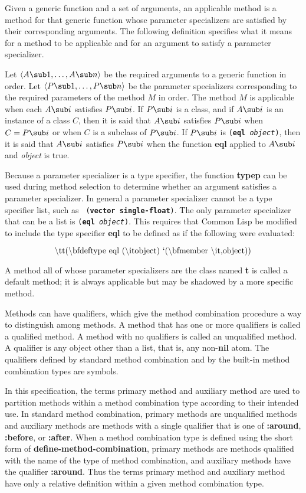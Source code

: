 Given a generic function and a set of arguments, an {\bit applicable
method\/} is a method for that generic function whose parameter
specializers are satisfied by their corresponding arguments.  The
following definition specifies what it means for a method to be
applicable and for an argument to satisfy a parameter specializer.

Let $\langle A\sub 1, \ldots, A\sub n\rangle$ be the required
arguments to a generic function in order. Let $\langle P\sub 1,
\ldots, P\sub n\rangle$ be the parameter specializers corresponding to
the required parameters of the method $M$ in order.  The method $M$ is
{\bit applicable\/} when each $A\sub i$ {\bit satisfies\/} $P\sub i$.
If $P\sub i$ is a class, and if $A\sub i$ is an instance of a class
$C$\negthinspace, then it is said that $A\sub i$ {\bit satisfies\/}
$P\sub i$ when $C=P\sub i$ or when $C$ is a subclass of $P\sub i$.  If
$P\sub i$ is {\tt ({\bf eql} {\it object\/})}, then it is said that
$A\sub i$ satisfies $P\sub i$ when the function {\bf eql} applied to
$A\sub i$ and {\it object} is true.

Because a parameter specializer is a type specifier, the function {\bf
typep} can be used during method selection to determine whether an
argument satisfies a parameter specializer.  In general a
parameter specializer cannot be a type specifier list, such as {\tt
({\bf vector single-float})}.  The only parameter specializer that can
be a list is {\tt ({\bf eql} {\it object\/})}.  This requires that
Common Lisp be modified to include the type specifier {\bf eql} to be
defined as if the following were evaluated:

$$\hbox{{\tt ({\bf deftype eql} ({\it object\/})
 `({\bf member} {\it ,object\/}))}}$$

A method all of whose parameter specializers are the class named {\bf
t} is called a {\bit default method}; it is always applicable but
may be shadowed by a more specific method.

Methods can have {\bit qualifiers}, which give the method combination
procedure a way to distinguish among methods.  A method that has one
or more qualifiers is called a {\bit qualified\/} method.
A method with no qualifiers is called an {\bit unqualified method}. 
A qualifier is any object other than a list, that is,
any non-{\bf nil} atom.  The qualifiers defined by standard method combination
and by the built-in method combination types are symbols.

In this specification, the terms {\bit primary method\/} and {\bit
auxiliary method\/} are used to partition methods within a method
combination type according to their intended use.  In standard method
combination, primary methods are unqualified methods and auxiliary
methods are methods with a single qualifier that is one of {\bf
:around}, {\bf :before}, or {\bf :after}.  When a method combination
type is defined using the short form of {\bf
define-method-combination}, primary methods are methods qualified with
the name of the type of method combination, and auxiliary methods have
the qualifier {\bf :around}.  Thus the terms {\bit primary method\/}
and {\bit auxiliary method\/} have only a relative definition within a
given method combination type.

